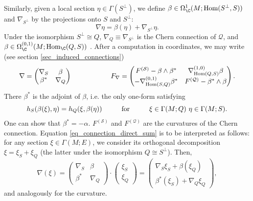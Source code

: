 Similarly, given a local section \(\eta\in \Gamma(S^\perp)\), we define \(\beta\in \Omega_\C^1(M;\mathrm{Hom}(S^\perp, S))\) and \(\nabla_{S^\perp}\) by the projections onto \(S\) and \(S^\perp\):
\[
\nabla \eta=\beta(\eta)+\nabla_{S^\perp} \eta.
\]
Under the isomorphism \(S^\perp \cong Q\), \(\nabla_{Q}\equiv\nabla_{S^\perp}\) is the Chern connection of \(\mathcal{Q}\), and \(\beta \in \Omega_\C^{(0,1)}(M; \mathrm{Hom}_\C(Q, S))\) \parencite[Prop. 1.6.6]{kobayashi_complex_vector_bundles}. After a computation in coordinates, we may write (see section \ref{sec_induced_connections})
\begin{equation} \label{eq_connection_direct_sum}
    \nabla=\begin{pmatrix}
        \nabla_S & \beta \\
        \beta^* & \nabla_Q
    \end{pmatrix} \hspace{2 cm}
    F_\nabla=
    \begin{pmatrix}
        F^{(\mathcal{S})}-\beta \wedge \beta^* & \nabla^{(1,0)}_{\mathrm{Hom}(Q, S)} \beta \\
        -\nabla^{(0,1)}_{\mathrm{Hom}(S,Q)}\beta^* & F^{(\mathcal{Q})}-\beta^* \wedge \beta
    \end{pmatrix}.
\end{equation}
There \(\beta^*\) is the adjoint of \(\beta\), i.e. the only one-form satisfying 
\[
h_S(\beta(\xi), \eta) = h_Q(\xi, \beta(\eta)) \hspace{1 cm} \text{for} \hspace{1 cm} \xi \in\Gamma(M;Q) \ \eta \in \Gamma(M; S).
\]
One can show that \(\beta^*=-\alpha\). \(F^{(\mathcal{S})}\) and \(F^{(\mathcal{Q})}\) are the curvatures of the Chern connection. Equation \eqref{eq_connection_direct_sum} is to be interpreted as follows: for any section \(\xi \in \Gamma(M;E)\), we consider its orthogonal decomposition \(\xi=\xi_S+\xi_{Q}\) (the latter under the isomorphism \(Q \cong S^\perp\)). Then, 
\begin{equation} \nonumber
\nabla(\xi) = \begin{pmatrix}
        \nabla_S & \beta \\
        \beta^* & \nabla_Q
    \end{pmatrix}\cdot \begin{pmatrix}
        \xi_S \\
        \xi_Q
    \end{pmatrix} = \begin{pmatrix}
        \nabla_S \xi_S +\beta (\xi_Q) \\
        \beta^*(\xi_S)+\nabla_Q \xi_Q
    \end{pmatrix},
\end{equation}
 and analogously for the curvature.

